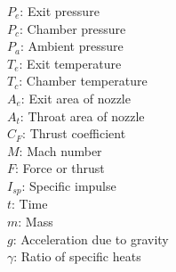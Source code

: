 $P_e$:	Exit pressure\\
$P_c$:	Chamber pressure\\
$P_a$:	Ambient pressure\\
$T_e$:	Exit temperature\\
$T_c$:	Chamber temperature\\
$A_e$:	Exit area of nozzle\\
$A_t$:	Throat area of nozzle\\ 
$C_F$:	Thrust coefficient\\
$M$:	Mach number\\
$F$:	Force or thrust\\
$I_{sp}$:	Specific impulse\\
$t$:	Time\\
$m$:	Mass\\
$g$:	Acceleration due to gravity\\
$\gamma$:	Ratio of specific heats